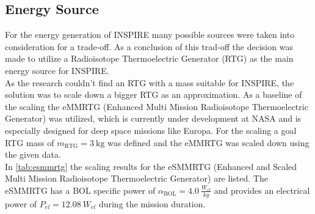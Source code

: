 \subsection{Energy Source}
For the energy generation of INSPIRE many possible sources were taken into consideration for a trade-off. As a conclusion of this trad-off the decision was made to utilize a Radioisotope Thermoelectric Generator (RTG) as the main energy source for INSPIRE.\\
As the research couldn't find an RTG with a mass suitable for INSPIRE, the solution was to scale down a bigger RTG as an approximation. As a baseline of the scaling the eMMRTG (Enhanced Multi Mission Radioisotope Thermoelectric Generator) was utilized, which is currently under development at NASA and is especially designed for deep space missions like Europa. For the scaling a goal RTG mass of $m_\text{RTG}=3 \ \text{kg}$ was defined and the eMMRTG was scaled down using the given data.\\
In \autoref{tab:esmmrtg} the scaling results for the eSMMRTG (Enhanced and Scaled Multi Mission Radioisotope Thermoelectric Generator) are listed. The eSMMRTG has a BOL specific power of $\alpha_\text{BOL}= 4.0 \ \frac{W_{el}}{kg}$ and provides an electrical power of $P_{el} = 12.08 \ W_{el}$ during the mission duration\cite{R.Abelsonetal..2004}\cite{S.Magdum.2019}\cite{Holgate.2015}\cite{eMMRTG.NASA}\cite{Lakdawalla.2018}.




%

